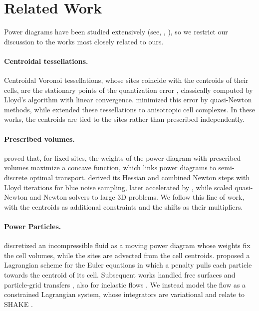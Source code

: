 \documentclass[main.tex]{subfiles}
\begin{document}
\section{Related Work}
\label{sec:related}

Power diagrams have been studied extensively (see, \eg, \cite{Aurenhammer1987PowerDiagrams, PlateauHolleville2026Tutorial}), so we restrict our discussion to the works most closely related to ours.

\paragraph{Centroidal tessellations.}
Centroidal Voronoi tessellations, whose sites coincide with the centroids of their cells, are the stationary points of the quantization error \cite{Lloyd1982Quantization}, classically computed by Lloyd's algorithm with linear convergence.
\citet{Liu2009CVT} minimized this error by quasi-Newton methods, while \citet{Budninskiy2016OVT} extended these tessellations to anisotropic cell complexes.
In these works, the centroids are tied to the sites rather than prescribed independently.

\paragraph{Prescribed volumes.}
\citet{Aurenhammer1998Minkowski} proved that, for fixed sites, the weights of the power diagram with prescribed volumes maximize a concave function, which links power diagrams to semi-discrete optimal transport.
\citet{deGoes2012BlueNoise} derived its Hessian and combined Newton steps with Lloyd iterations for blue noise sampling, later accelerated by \citet{Xin2016CentroidalPower}, while \citet{Levy2015Numerical, Levy2025LargeScale} scaled quasi-Newton and Newton solvers to large 3D problems.
We follow this line of work, with the centroids as additional constraints and the shifts as their multipliers.

\paragraph{Power Particles.}
\citet{deGoes2015PowerParticles} discretized an incompressible fluid as a moving power diagram whose weights fix the cell volumes, while the sites are advected from the cell centroids.
\citet{Gallouet2018Lagrangian} proposed a Lagrangian scheme for the Euler equations in which a penalty pulls each particle towards the centroid of its cell.
Subsequent works handled free surfaces \cite{Levy2022PartialOT, PlateauHolleville2026MorePower} and particle-grid transfers \cite{Qu2022PowerPIC}, also for inelastic flows \cite{Qu2023PowerPlastics}.
We instead model the flow as a constrained Lagrangian system, whose integrators are variational \cite{marsden2001discrete} and relate to SHAKE \cite{Ryckaert1977Shake}.
\end{document}

